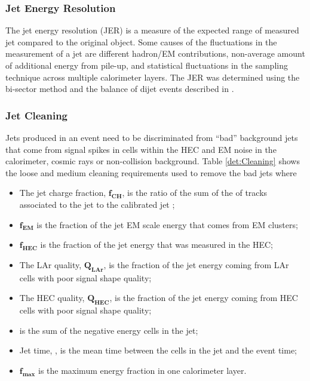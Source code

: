 \subsubsection{Jet Energy Resolution}

The jet energy resolution (JER) is a measure of the expected range of measured jet \pt{} compared to the original object. 
Some causes of the fluctuations in the measurement of a jet \pt{} are different hadron/EM contributions, non-average amount of additional energy from pile-up, and statistical fluctuations in the sampling technique across multiple calorimeter layers.
The JER was determined using the bi-sector method and the \pt{} balance of dijet events described in \cite{ref:JER,ref:JER2}. 




\subsubsection{Jet Cleaning}

Jets produced in an event need to be discriminated from ``bad'' background jets that come from  signal spikes in cells within the HEC and EM noise in the calorimeter, cosmic rays or non-collision background.
Table \ref{det:Cleaning} shows the loose and medium cleaning requirements used to remove the bad jets where
\begin{itemize}
  \item The jet charge fraction, $\mathbf{f_{CH}}$, is the ratio of the sum of the \pt{} of tracks associated to the jet to the calibrated jet \pt{};
  \item  $\mathbf{f_{EM}}$ is the fraction of the jet EM scale energy that comes from EM clusters;
  \item  $\mathbf{f_{HEC}}$ is the fraction of the jet energy that was measured in the HEC;
  \item The LAr quality, $\mathbf{Q_{LAr}}$, is the fraction of the jet energy coming from LAr cells with poor signal shape quality;
  \item The HEC quality, $\mathbf{Q_{HEC}}$, is the fraction of the jet energy coming from HEC cells with poor signal shape quality;
  \item {} is the sum of the negative energy cells in the jet;
  \item Jet time, , is the mean time between the cells in the jet and the event time;
  \item $\mathbf{f_{max}}$ is the maximum energy fraction in one calorimeter layer.
\end{itemize}

